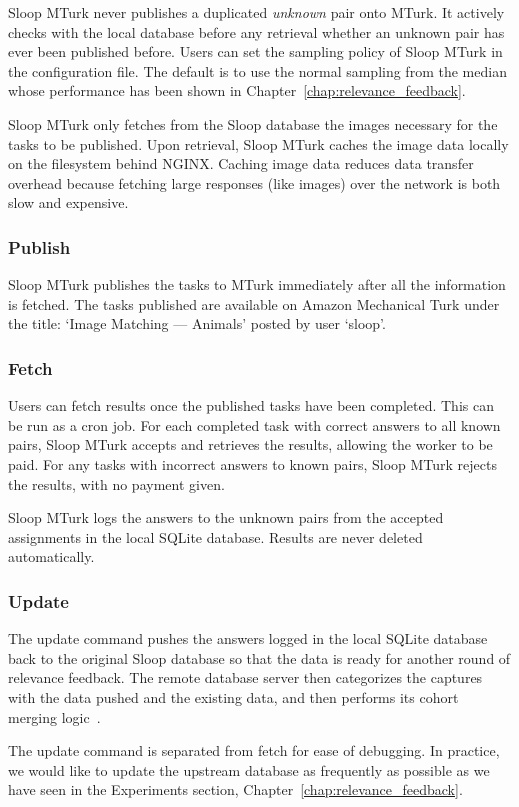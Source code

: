   Sloop MTurk never publishes a duplicated \emph{unknown} pair onto MTurk. It
  actively checks with the local database before any retrieval whether an unknown pair
  has ever been published before. Users can set the sampling policy of Sloop MTurk in
  the configuration file. The default is to use the normal sampling from the
  median whose performance has been shown in
  Chapter~\ref{chap:relevance_feedback}.

  Sloop MTurk only fetches from the Sloop database the images necessary for the
  tasks to be published.  Upon retrieval, Sloop MTurk caches the image data
  locally on the filesystem behind NGINX\@. Caching image data reduces data transfer
  overhead because fetching large responses (like images) over the network is
  both slow and expensive.

  \subsubsection{Publish}

  Sloop MTurk publishes the tasks to MTurk immediately after all the
  information is fetched. The tasks published are available on Amazon Mechanical
  Turk under the title: `Image Matching --- Animals' posted by user `sloop'.

  \subsubsection{Fetch}

  Users can fetch results once the published tasks have been completed. This can
  be run as a cron job.  For each completed task with correct answers to all
  known pairs, Sloop MTurk accepts and retrieves the results, allowing the worker
  to be paid.  For any tasks with incorrect answers to known pairs, Sloop MTurk
  rejects the results, with no payment given.

  Sloop MTurk logs the answers to the unknown pairs from the accepted assignments
  in the local SQLite database. Results are never deleted automatically.

  \subsubsection{Update}

  The update command pushes the answers logged in the local SQLite database back
  to the original Sloop database so that the data is ready for another round of
  relevance feedback. The remote database server then categorizes the captures
  with the data pushed and the existing data, and then performs its cohort
  merging logic~\cite{sloopdocs}.

  The update command is separated from fetch for ease of debugging. In
  practice, we would like to update the upstream database as frequently as
  possible as we have seen in the Experiments section,
  Chapter~\ref{chap:relevance_feedback}.


